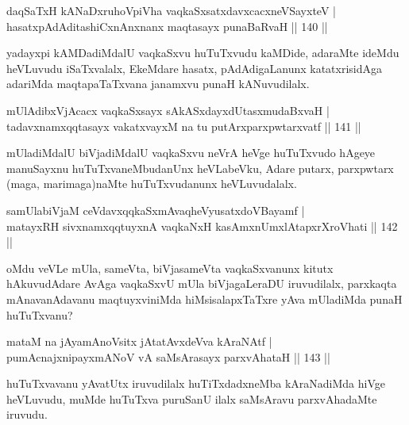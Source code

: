 \begin{shl}
daqSaTxH kANaDxruhoV\s piVha vaqkaSxsatxdavxcacxneVSayxteV |\\
hasatxpAdAditashiCxnAnxnanx maqtasayx punaBaRvaH \hfill || 140 ||
\end{shl}

\begin{artha}
yadayxpi kAMDadiMdalU vaqkaSxvu huTuTxvudu kaMDide, adaraMte ideMdu heVLuvudu iSaTxvalalx, EkeMdare hasatx, pAdAdigaLanunx katatxrisidAga adariMda maqtapaTaTxvana janamxvu punaH kANuvudilalx.
\end{artha}


\begin{shl}
mUlAdibxVjAcacx vaqkaSxsayx sAkASxdayxdUtasxmudaBxvaH |\\
tadavxnamxqqtasayx vakatxvayxM na tu putArxparxpwtarxvatf \hfill || 141 ||
\end{shl}

\begin{artha}%
mUladiMdalU biVjadiMdalU vaqkaSxvu neVrA heVge huTuTxvudo hAgeye manuSayxnu huTuTxvaneMbudanUnx heVLabeVku, Adare putarx, parxpwtarx (maga, marimaga)naMte huTuTxvudanunx heVLuvudalalx.
\end{artha}


\begin{shl}
samUlabiVjaM ceVdavxqqkaSxmAvaqheVyusatxdoVBayamf |\\
matayxRH sivxnamxqqtuyxnA vaqkaNxH kasAmxnUmxlAtapxrXroVhati \hfill || 142 ||
\end{shl}

\begin{artha}
oMdu veVLe mUla, sameVta, biVjasameVta vaqkaSxvanunx kitutx hAkuvudAdare AvAga vaqkaSxvU mUla biVjagaLeraDU iruvudilalx, parxkaqta mAnavanAdavanu maqtuyxviniMda hiMsisalapxTaTxre yAva mUladiMda punaH huTuTxvanu?
\end{artha}


\begin{shl}
mataM na jAyamAnoV\s sitx jAtatAvxdeVva kAraNAtf |\\
pumAcnajxnipayxmANoV vA saMsArasayx parxvAhataH \hfill || 143 ||
\end{shl}

\begin{artha}
huTuTxvavanu yAvatUtx iruvudilalx huTiTxdadxneMba kAraNadiMda hiVge heVLuvudu, muMde huTuTxva puruSanU ilalx saMsAravu parxvAhadaMte iruvudu.
\end{artha}

